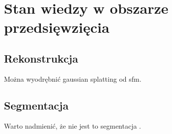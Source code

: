 \section{Stan wiedzy w obszarze przedsięwzięcia}
\subsection{Rekonstrukcja}
Można wyodrębnić gaussian splatting od sfm.
\subsection{Segmentacja}
Warto nadmienić, że nie jest to segmentacja \cite{pointnet}.